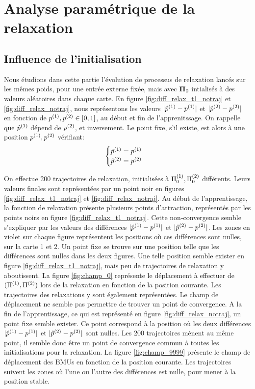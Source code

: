 \documentclass[../main]{subfiles}
\begin{document}
\section{Analyse paramétrique de la relaxation}

\subsection{Influence de l'initialisation \label{sec:pf}}

Nous étudions dans cette partie l'évolution de processus de relaxation lancés sur les mêmes poids, pour une entrée externe fixée, mais avec $\mathbf{\Pi}_0$ intialisés à des valeurs aléatoires dans chaque carte.
En figure \ref{fig:diff_relax_t1_notraj} et \ref{fig:diff_relax_notraj}, nous représentons les valeurs $\lvert \hat{p}^{({1})} - p^{({1})} \rvert$ et $\lvert \hat{p}^{({2})} - p^{({2})}\rvert$ en fonction de $p^{({1})},p^{({2})} \in [0,1]$, au début et fin de l'apprenitssage. On rappelle que $\hat{p}^{({1})}$ dépend de $p^{({2})}$, et inversement.
Le point fixe, s'il existe, est alors à une position $p^{({1})},p^{({2})}$ vérifiant:
\begin{equation*}
\begin{cases}
\hat{p}^{({1})} = p^{({1})}\\
\hat{p}^{({2})} = p^{({2})}\\
\end{cases}
\end{equation*}

On effectue 200 trajectoires de relaxation, initialisées à $\Pi^{({1})}_0,\Pi^{({2})}_0$ différents. Leurs valeurs finales sont représentées par un point noir en figures \ref{fig:diff_relax_t1_notraj} et \ref{fig:diff_relax_notraj}. 
Au début de l'apprentissage, la fonction de relaxation présente plusieurs points d'attraction, représentés par les points noirs en figure \ref{fig:diff_relax_t1_notraj}. Cette non-convergence semble s'expliquer par les valeurs des différences $\lvert \hat{p}^{({1})} - p^{({1})} \rvert$ et $\lvert \hat{p}^{({2})} - p^{({2})}\rvert$. Les zones en violet sur chaque figure représentent les positions où ces différences sont nulles, sur la carte 1 et 2. Un point fixe se trouve sur une position telle que les différences sont nulles dans les deux figures. Une telle position semble exister en figure \ref{fig:diff_relax_t1_notraj}, mais peu de trajectoires de relaxation y aboutissent. La figure \ref{fig:champ_0} représente le déplacement à effectuer de $(\Pi^{({1})},\Pi^{({2})})$ lors de la relaxation en fonction de la position courante. Les trajectoires des relaxations y sont également représentées. Le champ de déplacement ne semble pas permettre de trouver un point de convergence.
A la fin de l'apprentissage, ce qui est représenté en figure \ref{fig:diff_relax_notraj}, un point fixe semble exister. Ce point correspond à la position où les deux différences $\lvert \hat{p}^{({1})} - p^{({1})} \rvert$ et $\lvert \hat{p}^{({2})} - p^{({2})}\rvert$ sont nulles. Les 200 trajectoires mènent au même point, il semble donc être un point de convergence commun à toutes les initialisations pour la relaxation. La figure \ref{fig:champ_9999} présente le champ de déplacement des BMUs en fonction de la position courante. Les trajectoires suivent les zones où l'une ou l'autre des différences est nulle, pour mener à la position stable. 
\end{document}
